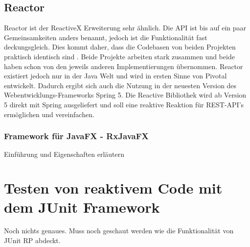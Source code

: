 \subsection{Reactor}
Reactor ist der ReactiveX Erweiterung sehr ähnlich. Die API ist bis auf ein paar Gemeinsamkeiten anders benannt, jedoch ist die Funktionalität fast deckungsgleich. Dies kommt daher, dass die Codebasen von beiden Projekten praktisch identisch sind \cite{Karnok.2016}. Beide Projekte arbeiten stark zusammen und beide haben schon von den jeweils anderen Implementierungen übernommen. Reactor existiert jedoch nur in der Java Welt und wird in ersten Sinne von Pivotal entwickelt. Dadurch ergibt sich auch die Nutzung in der neuesten Version des Webentwicklungs-Frameworks Spring 5. Die Reactive Bibliothek wird ab Version 5 direkt mit Spring ausgeliefert und soll eine reaktive Reaktion für REST-API's ermöglichen und vereinfachen. 
\subsubsection{Framework für JavaFX - RxJavaFX}
Einführung und Eigenschaften erläutern
\section{Testen von reaktivem Code mit dem JUnit Framework}
Noch nichts genaues. Muss noch geschaut werden wie die Funktionalität von JUnit RP abdeckt.